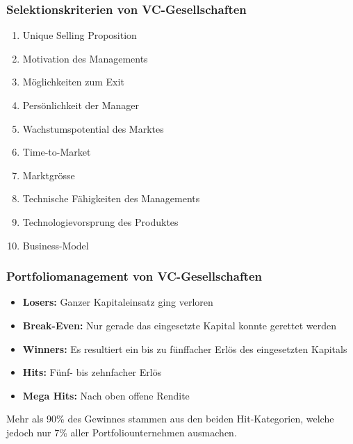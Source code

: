 \subsubsection{Selektionskriterien von VC-Gesellschaften}
\begin{multicols}{2}
	\begin{enumerate}
		\item Unique Selling Proposition
		\item Motivation des Managements
		\item Möglichkeiten zum Exit
		\item Persönlichkeit der Manager
		\item Wachstumspotential des Marktes
		\item Time-to-Market
		\item Marktgrösse
		\item Technische Fähigkeiten des Managements
		\item Technologievorsprung des Produktes
		\item Business-Model
	\end{enumerate}
\end{multicols}

\subsubsection{Portfoliomanagement von VC-Gesellschaften}
\begin{itemize}
	\item \textbf{Losers:} Ganzer Kapitaleinsatz ging verloren
	\item \textbf{Break-Even:} Nur gerade das eingesetzte Kapital konnte gerettet werden
	\item \textbf{Winners:} Es resultiert ein bis zu fünffacher Erlös des eingesetzten Kapitals
	\item \textbf{Hits:} Fünf- bis zehnfacher Erlös
	\item \textbf{Mega Hits:} Nach oben offene Rendite
\end{itemize}
Mehr als 90\% des Gewinnes stammen aus den beiden Hit-Kategorien, welche jedoch nur 7\% aller Portfoliounternehmen ausmachen.

